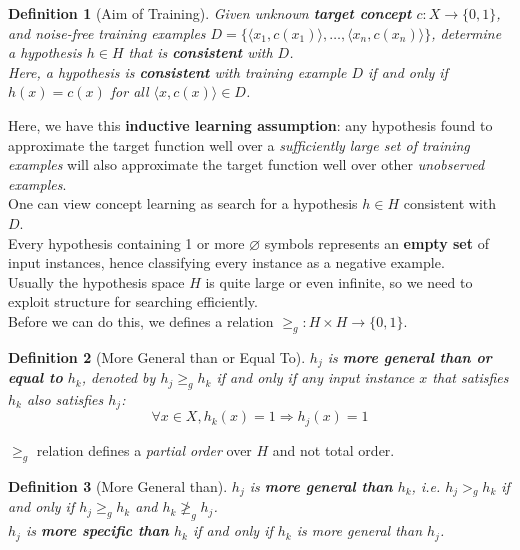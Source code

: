\documentclass[12pt]{article}
\newtheorem{definition}{Definition}[section]
\theoremstyle{definition}
\begin{document}
\begin{definition}[Aim of Training]
\normalfont Given unknown \textbf{target concept} $c: X\to \{0,1\}$, and \textit{noise-free} training examples $D =  \{\langle x_1, c(x_1)\rangle, \ldots, \langle x_n, c(x_n)\rangle\}$, determine a hypothesis $h\in H$ that is \textbf{consistent} with $D$.\\
Here, a hypothesis is \textbf{consistent} with training example $D$ \textit{if and only if} $h(x)=c(x)$ for all $\langle x, c(x)\rangle\in D$.
\end{definition}
Here, we have this \textbf{inductive learning assumption}: any hypothesis found to approximate the target function well over a \textit{sufficiently large set of training examples} will also approximate the target function well over other \textit{unobserved examples}.\\
One can view concept learning as search for a hypothesis $h\in H$ consistent with $D$.\\
Every hypothesis containing 1 or more $\varnothing$ symbols represents an \textbf{empty set} of input instances, hence classifying every instance as a negative example.\\
Usually the hypothesis space $H$ is quite large or even infinite, so we need to exploit structure for searching efficiently.\\
Before we can do this, we defines a relation $\geq_g: H\times H\to \{0,1\}$.
\begin{definition}[More General than or Equal To]
\normalfont $h_j$ is \textbf{more general than or equal to} $h_k$, denoted by $h_j\geq_g h_k$ if and only if any input instance $x$ that satisfies $h_k$ also satisfies $h_j$:
\[
\forall x\in X, h_k(x)=1\Rightarrow h_j(x)=1
\]
\end{definition}
$\geq_g$ relation defines a \textit{partial order} over $H$ and not total order.
\begin{definition}[More General than]
\normalfont $h_j$ is \textbf{more general than} $h_k$, i.e. $h_j>_g h_k$ if and only if $h_j\geq_g h_k$ and $h_k\not\geq_g h_j$.\\
$h_j$ is \textbf{more specific than} $h_k$ if and only if $h_k$ is more general than $h_j$.
\end{definition}
\end{document}
